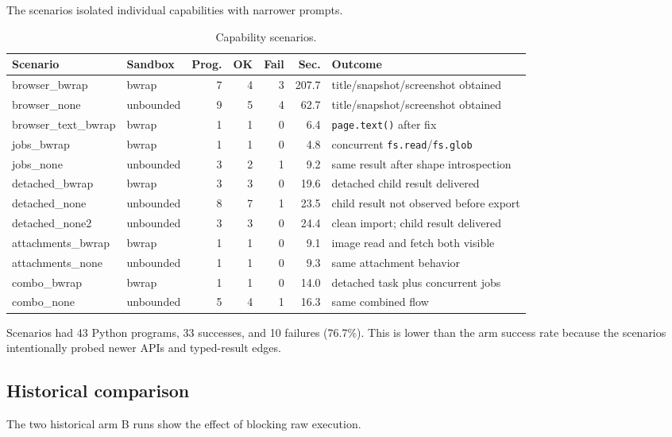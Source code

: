 \documentclass[11pt]{article}
\newcommand{\code}[1]{\texttt{#1}}
\begin{document}
The scenarios isolated individual capabilities with narrower prompts.

\begin{table}[h]
\centering
\small
\begin{tabular}{p{3.7cm}p{1.8cm}rrrrp{5.6cm}}
\toprule
\textbf{Scenario} & \textbf{Sandbox} & \textbf{Prog.} & \textbf{OK} & \textbf{Fail} & \textbf{Sec.} & \textbf{Outcome} \\
\midrule
browser\_bwrap & bwrap & 7 & 4 & 3 & 207.7 & title/snapshot/screenshot obtained \\
browser\_none & unbounded & 9 & 5 & 4 & 62.7 & title/snapshot/screenshot obtained \\
browser\_text\_bwrap & bwrap & 1 & 1 & 0 & 6.4 & \code{page.text()} after fix \\
jobs\_bwrap & bwrap & 1 & 1 & 0 & 4.8 & concurrent \code{fs.read}/\code{fs.glob} \\
jobs\_none & unbounded & 3 & 2 & 1 & 9.2 & same result after shape introspection \\
detached\_bwrap & bwrap & 3 & 3 & 0 & 19.6 & detached child result delivered \\
detached\_none & unbounded & 8 & 7 & 1 & 23.5 & child result not observed before export \\
detached\_none2 & unbounded & 3 & 3 & 0 & 24.4 & clean import; child result delivered \\
attachments\_bwrap & bwrap & 1 & 1 & 0 & 9.1 & image read and fetch both visible \\
attachments\_none & unbounded & 1 & 1 & 0 & 9.3 & same attachment behavior \\
combo\_bwrap & bwrap & 1 & 1 & 0 & 14.0 & detached task plus concurrent jobs \\
combo\_none & unbounded & 5 & 4 & 1 & 16.3 & same combined flow \\
\bottomrule
\end{tabular}
\caption{Capability scenarios.}
\end{table}

Scenarios had 43 Python programs, 33 successes, and 10 failures (76.7\%).  This
is lower than the arm success rate because the scenarios intentionally probed
newer APIs and typed-result edges.

\subsection{Historical comparison}

The two historical arm B runs show the effect of blocking raw execution.
\end{document}
